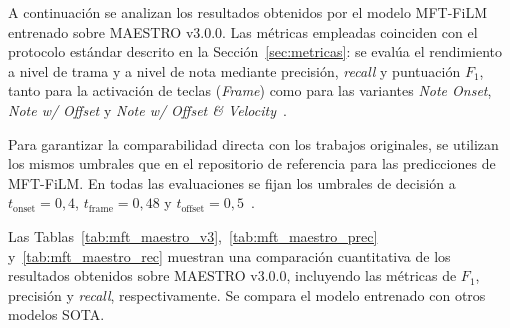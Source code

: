 \documentclass[11pt,spanish,listoffigures,listoftables]{tfgetsinf}
\begin{document}
A continuación se analizan los resultados obtenidos por el modelo MFT-FiLM entrenado sobre MAESTRO v3.0.0.
Las métricas empleadas coinciden con el protocolo estándar descrito en la Sección~\ref{sec:metricas}: 
se evalúa el rendimiento a nivel de trama y a nivel de nota mediante precisión, \textit{recall} y puntuación $F_1$, 
tanto para la activación de teclas (\textit{Frame}) como para las variantes \textit{Note Onset}, 
\textit{Note w/ Offset} y \textit{Note w/ Offset \& Velocity}~\cite{wang2025mftfilm,yan2024transkun}.

Para garantizar la comparabilidad directa con los trabajos originales, se utilizan los mismos umbrales que en el repositorio
de referencia para las predicciones de MFT-FiLM. En todas las evaluaciones se fijan los umbrales 
de decisión a $t_{\text{onset}} = 0{,}4$, $t_{\text{frame}} = 0{,}48$ y $t_{\text{offset}} = 0{,}5$~\cite{wang2025mftfilm}.

Las Tablas~\ref{tab:mft_maestro_v3},~\ref{tab:mft_maestro_prec} y~\ref{tab:mft_maestro_rec} muestran una comparación cuantitativa de los resultados obtenidos
sobre MAESTRO v3.0.0, incluyendo las métricas de $F_1$, precisión y \textit{recall}, respectivamente. Se compara el modelo entrenado con otros modelos SOTA.
\begin{table}[H]
  \centering
  \caption[Resultados del $F_1$ de MFT-FiLM sobre MAESTRO v3.0.0]{%
  Resultados de transcripción de notas sobre MAESTRO v3.0.0. 
  Se muestran el número de parámetros y las puntuaciones $F_1$ a nivel de trama 
  (\textit{Frame}) y de nota (\textit{Note Onset}, \textit{Note w/ Offset}, 
  \textit{Note w/ Offset \& Velocity}). Todas las métricas se expresan en porcentaje (\%).}
  \label{tab:mft_maestro_v3}
\end{table}
\end{document}
